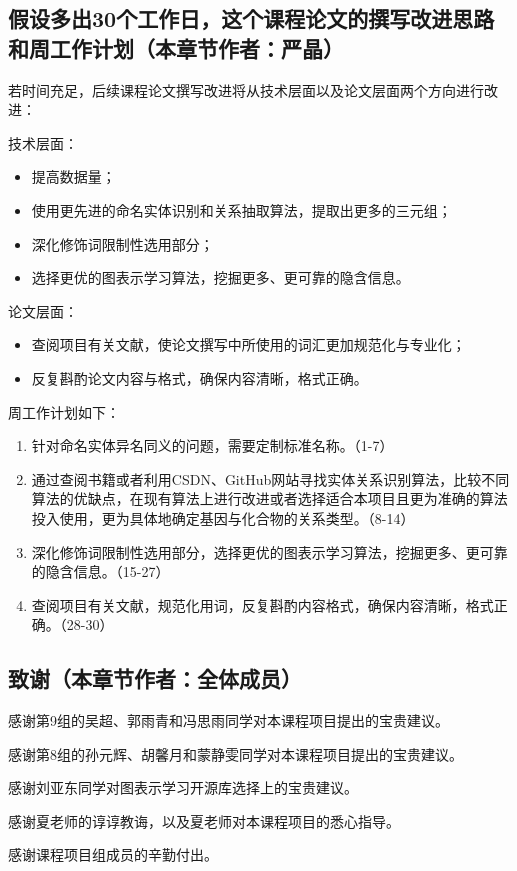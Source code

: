 \documentclass[twocolumn]{article}
\begin{document}
\subsection{假设多出30个工作日，这个课程论文的撰写改进思路和周工作计划（本章节作者：严晶）}
若时间充足，后续课程论文撰写改进将从技术层面以及论文层面两个方向进行改进：\par
技术层面：
\begin{itemize}
	\item 提高数据量；
	\item 使用更先进的命名实体识别和关系抽取算法，提取出更多的三元组；
	\item 深化修饰词限制性选用部分；
	\item 选择更优的图表示学习算法，挖掘更多、更可靠的隐含信息。
\end{itemize}\par
论文层面：
\begin{itemize}
	\item 查阅项目有关文献，使论文撰写中所使用的词汇更加规范化与专业化；
	\item 反复斟酌论文内容与格式，确保内容清晰，格式正确。
\end{itemize}\par
周工作计划如下：\par
\begin{enumerate}
	\item 针对命名实体异名同义的问题，需要定制标准名称。（1-7）
	\item 通过查阅书籍或者利用CSDN、GitHub网站寻找实体关系识别算法，比较不同算法的优缺点，在现有算法上进行改进或者选择适合本项目且更为准确的算法投入使用，更为具体地确定基因与化合物的关系类型。（8-14）
	\item 深化修饰词限制性选用部分，选择更优的图表示学习算法，挖掘更多、更可靠的隐含信息。（15-27）
	\item 查阅项目有关文献，规范化用词，反复斟酌内容格式，确保内容清晰，格式正确。（28-30）
\end{enumerate}

\subsection{致谢（本章节作者：全体成员）}
感谢第9组的吴超、郭雨青和冯思雨同学对本课程项目提出的宝贵建议。\par
感谢第8组的孙元辉、胡馨月和蒙静雯同学对本课程项目提出的宝贵建议。\par
感谢刘亚东同学对图表示学习开源库选择上的宝贵建议。\par
感谢夏老师的谆谆教诲，以及夏老师对本课程项目的悉心指导。\par
感谢课程项目组成员的辛勤付出。\par
\end{document}
